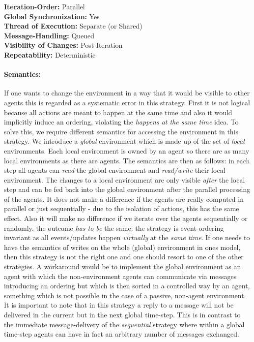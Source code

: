 \textbf{Iteration-Order:} Parallel \\
\textbf{Global Synchronization:} Yes \\
\textbf{Thread of Execution:} Separate (or Shared) \\
\textbf{Message-Handling:} Queued \\
\textbf{Visibility of Changes:}	Post-Iteration \\
\textbf{Repeatability:}	Deterministic 

\paragraph{Semantics:} If one wants to change the environment in a way that it would be visible to other agents this is regarded as a systematic error in this strategy. First it is not logical because all actions are meant to happen at the same time and also it would implicitly induce an ordering, violating the \textit{happens at the same time} idea. To solve this, we require different semantics for accessing the environment in this strategy. We introduce a \textit{global} environment which is made up of the set of \textit{local} environments. Each local environment is owned by an agent so there are as many local environments as there are agents. The semantics are then as follows: in each step all agents can \textit{read} the global environment and \textit{read/write} their local environment. The changes to a local environment are only visible \textit{after} the local step and can be fed back into the global environment after the parallel processing of the agents. 
It does not make a difference if the agents are really computed in parallel or just sequentially - due to the isolation of actions, this has the same effect. Also it will make no difference if we iterate over the agents sequentially or randomly, the outcome \textit{has to be} the same: the strategy is event-ordering invariant as all events/updates happen \textit{virtually} at the \textit{same time}. If one needs to have the semantics of writes on the whole (global) environment in ones model, then this strategy is not the right one and one should resort to one of the other strategies. A workaround would be to implement the global environment as an agent with which the non-environment agents can communicate via messages introducing an ordering but which is then sorted in a controlled way by an agent, something which is not possible in the case of a passive, non-agent environment.
It is important to note that in this strategy a reply to a message will not be delivered in the current but in the next global time-step. This is in contrast to the immediate message-delivery of the \textit{sequential} strategy where within a global time-step agents can have in fact an arbitrary number of messages exchanged.


